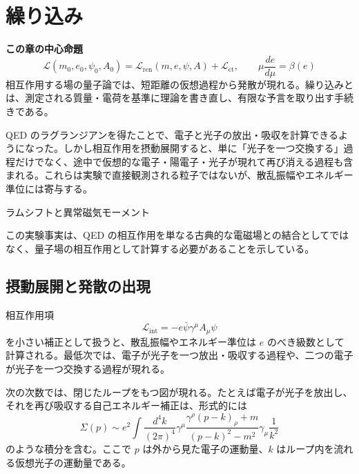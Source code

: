 \section{繰り込み}

\noindent\textbf{この章の中心命題}
\[
\boxed{
\mathcal{L}(m_0,e_0,\psi_0,A_0)
=
\mathcal{L}_{\mathrm{ren}}(m,e,\psi,A)
+\mathcal{L}_{\mathrm{ct}},
\qquad
\mu\frac{de}{d\mu}=\beta(e)
}
\]
相互作用する場の量子論では、短距離の仮想過程から発散が現れる。繰り込みとは、測定される質量・電荷を基準に理論を書き直し、有限な予言を取り出す手続きである。

QED のラグランジアンを得たことで、電子と光子の放出・吸収を計算できるようになった。しかし相互作用を摂動展開すると、単に「光子を一つ交換する」過程だけでなく、途中で仮想的な電子・陽電子・光子が現れて再び消える過程も含まれる。これらは実験で直接観測される粒子ではないが、散乱振幅やエネルギー準位には寄与する。

\begin{experimentalfact}{ラムシフトと異常磁気モーメント}
\end{experimentalfact}

この実験事実は、QED の相互作用を単なる古典的な電磁場との結合としてではなく、量子場の相互作用として計算する必要があることを示している。

\subsection{摂動展開と発散の出現}
相互作用項
\[
\mathcal{L}_{\mathrm{int}}
=
-e\bar{\psi}\gamma^\mu A_\mu\psi
\]
を小さい補正として扱うと、散乱振幅やエネルギー準位は $e$ のべき級数として計算される。最低次では、電子が光子を一つ放出・吸収する過程や、二つの電子が光子を一つ交換する過程が現れる。

次の次数では、閉じたループをもつ図が現れる。たとえば電子が光子を放出し、それを再び吸収する自己エネルギー補正は、形式的には
\[
\Sigma(p)
\sim
e^2
\int \frac{d^4k}{(2\pi)^4}
\gamma^\mu
\frac{\gamma^\rho(p-k)_\rho+m}{(p-k)^2-m^2}
\gamma_\mu
\frac{1}{k^2}
\]
のような積分を含む。ここで $p$ は外から見た電子の運動量、$k$ はループ内を流れる仮想光子の運動量である。


